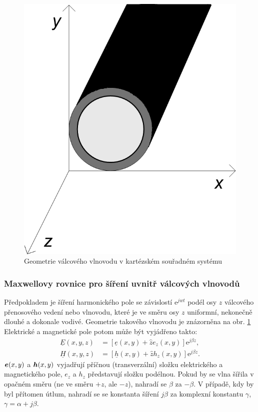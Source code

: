 \documentclass[12pt,a4paper,oneside]{article}
\numberwithin{equation}{section} %
\numberwithin{figure}{section} %
\numberwithin{table}{section} %
\newcommand{\me}{\mathrm{e}} %
\renewcommand{\vec}[1]{\mbox{\boldmath$#1$}} %
\newcommand{\faz}[1]{{\underline{#1}}} %
\begin{document}
\begin{figure} 
\begin{center}
\includegraphics{geometrie.png}
\caption{Geometrie válcového vlnovodu v kartézském souřadném systému}
\label{geometrie}
\end{center}
\end{figure}

\subsubsection{Maxwellovy rovnice pro šíření uvnitř válcových vlnovodů}
Předpokladem je šíření harmonického pole se závislostí $\me ^{jwt}$ podél osy $z$ válcového přenosového vedení nebo vlnovodu, které je ve směru osy $z$ uniformní, nekonečně dlouhé a dokonale vodivé. Geometrie takového vlnovodu je znázorněna na obr. \ref{geometrie} Elektrické a magnetické pole potom může být vyjádřeno takto:
\begin{subequations}
\label{hromadna}
\begin{align}
\faz{E}(x, y, z)&=[\faz{e}(x, y) + \hat{z}e_z(x, y)] \me ^{j\beta z} ,
\\
\faz{H}(x, y, z)&=[\faz{h}(x, y) + \hat{z}h_z(x, y)] \me ^{j\beta z} .
\end{align}
\end{subequations}
$\vec{e}(x,y)$ a $\vec{h}(x,y)$ vyjadřují příčnou (transverzální) složku elektrického a magnetického pole, $e_z$ a $h_z$ představují složku podélnou. Pokud by se vlna šířila v opačném směru (ne ve směru $+z$, ale $-z$), nahradí se $\beta$ za $-\beta$. V případě, kdy by byl přítomen útlum, nahradí se se konstanta šíření $j \beta$ za komplexní konstantu $\gamma$, $\gamma = \alpha + j \beta$.
\end{document}
